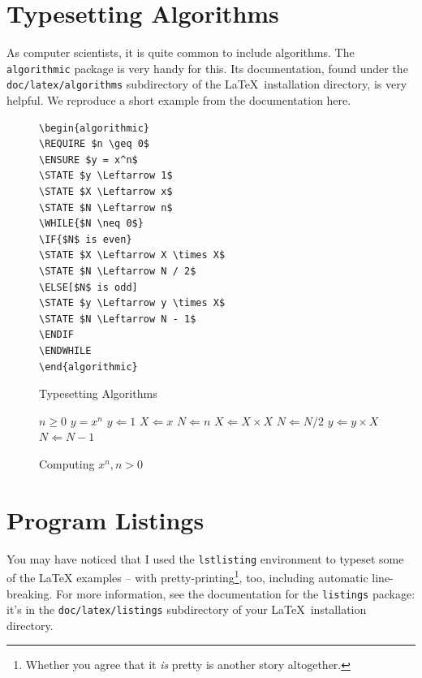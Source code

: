 \section{Typesetting Algorithms}

As computer scientists, it is quite common to include algorithms.  The \verb|algorithmic| package is very handy for this.  Its documentation, found under the \verb|doc/latex/algorithms| subdirectory of the \LaTeX\ installation directory, is very helpful.  We reproduce a short example from the documentation here.

\begin{figure}[hbt!]
\begin{lstlisting}
\begin{algorithmic}
\REQUIRE $n \geq 0$
\ENSURE $y = x^n$
\STATE $y \Leftarrow 1$
\STATE $X \Leftarrow x$
\STATE $N \Leftarrow n$
\WHILE{$N \neq 0$}
\IF{$N$ is even}
\STATE $X \Leftarrow X \times X$
\STATE $N \Leftarrow N / 2$
\ELSE[$N$ is odd]
\STATE $y \Leftarrow y \times X$
\STATE $N \Leftarrow N - 1$
\ENDIF
\ENDWHILE
\end{algorithmic}
\end{lstlisting}
\caption{Typesetting Algorithms}\label{fig:lst:algo}
\end{figure}

\begin{figure}[hbt!]
\begin{algorithmic}
\REQUIRE $n \geq 0$
\ENSURE $y = x^n$
\STATE $y \Leftarrow 1$
\STATE $X \Leftarrow x$
\STATE $N \Leftarrow n$
\STATE $X \Leftarrow X \times X$
\STATE $N \Leftarrow N / 2$
\ELSE[$N$ is odd]
\STATE $y \Leftarrow y \times X$
\STATE $N \Leftarrow N - 1$
\ENDIF
\ENDWHILE
\end{algorithmic}
\caption{Computing $x^n, n > 0$}
\end{figure}

\section{Program Listings}

You may have noticed that I used the \verb|lstlisting| environment to typeset some of the \LaTeX{} examples -- with pretty-printing\footnote{Whether you agree that it \emph{is} pretty is another story altogether.}, too, including automatic line-breaking.  For more information, see the documentation for the \verb|listings| package: it's in the \verb|doc/latex/listings| subdirectory of your \LaTeX\ installation directory.

